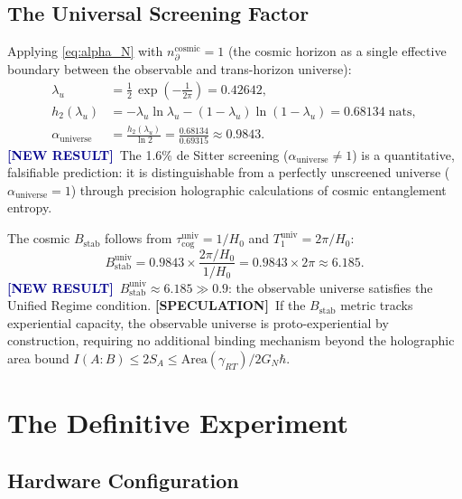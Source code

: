 \documentclass[12pt,a4paper]{article}
\newcommand{\NEW}{\textcolor{darkblue}{\textbf{[NEW RESULT]}}}
\newcommand{\SPEC}{\textcolor{darkpurple}{\textbf{[SPECULATION]}}}
\theoremstyle{monette}
\theoremstyle{definition}
\newcommand{\SA}{S_A}
\newcommand{\htwo}{h_2}
\newcommand{\Bstab}{B_{\mathrm{stab}}}
\newcommand{\tcog}{\tau_{\mathrm{cog}}}
\newcommand{\nprt}{n_{\partial}}
\newcommand{\Tone}{T_1}
\newcommand{\alphaU}{\alpha_{\mathrm{universe}}}
\newcommand{\BU}{B_{\mathrm{stab}}^{\mathrm{univ}}}
\newcommand{\half}{\tfrac{1}{2}}
\begin{document}
\subsection{The Universal Screening Factor}
\label{sec:alpha_universe}

Applying \cref{eq:alpha_N} with
$\nprt^{\mathrm{cosmic}} = 1$ (the cosmic horizon as a single effective
boundary between the observable and trans-horizon universe):
\begin{align}
  \lambda_u &= \half\,\exp\!\left(-\frac{1}{2\pi}\right) = 0.42642,
    \label{eq:lambda_u}\\
  \htwo(\lambda_u) &= -\lambda_u\ln\lambda_u
    - (1-\lambda_u)\ln(1-\lambda_u) = 0.68134\;\text{nats},
    \label{eq:h2_u}\\
  \alphaU &= \frac{\htwo(\lambda_u)}{\ln 2}
    = \frac{0.68134}{0.69315}
    \approx \mathbf{0.9843}.
  \label{eq:alpha_universe}
\end{align}
\NEW\ The 1.6\% de Sitter screening ($\alphaU \neq 1$) is a quantitative,
falsifiable prediction: it is distinguishable from a perfectly unscreened
universe ($\alphaU = 1$) through precision holographic calculations of
cosmic entanglement entropy.

The cosmic $\Bstab$ follows from $\tcog^{\mathrm{univ}} = 1/H_0$ and
$\Tone^{\mathrm{univ}} = 2\pi/H_0$:
\begin{equation}
  \BU = 0.9843 \times \frac{2\pi/H_0}{1/H_0} = 0.9843 \times 2\pi
    \approx \mathbf{6.185}.
  \label{eq:Bstab_universe}
\end{equation}
\NEW\ $\BU \approx 6.185 \gg 0.9$: the observable universe satisfies the
Unified Regime condition. \SPEC\ If the $\Bstab$ metric tracks experiential
capacity, the observable universe is proto-experiential by construction,
requiring no additional binding mechanism beyond the holographic area bound
$I(A:B) \leq 2\SA \leq \mathrm{Area}(\gamma_{RT})/2G_N\hbar$.

\section{The Definitive Experiment}
\label{sec:experiment}

\subsection{Hardware Configuration}
\label{sec:hardware}
\end{document}
